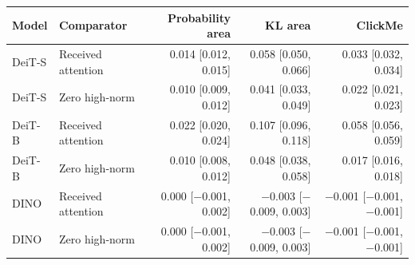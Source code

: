 \begin{tabular}{@{}llrrr@{}}
\toprule
Model & Comparator & Probability area & KL area & ClickMe \\
\midrule
DeiT-S & Received attention & 0.014 [0.012, 0.015] & 0.058 [0.050, 0.066] & 0.033 [0.032, 0.034] \\
DeiT-S & Zero high-norm & 0.010 [0.009, 0.012] & 0.041 [0.033, 0.049] & 0.022 [0.021, 0.023] \\
DeiT-B & Received attention & 0.022 [0.020, 0.024] & 0.107 [0.096, 0.118] & 0.058 [0.056, 0.059] \\
DeiT-B & Zero high-norm & 0.010 [0.008, 0.012] & 0.048 [0.038, 0.058] & 0.017 [0.016, 0.018] \\
DINO & Received attention & 0.000 [$-$0.001, 0.002] & $-$0.003 [$-$0.009, 0.003] & $-$0.001 [$-$0.001, $-$0.001] \\
DINO & Zero high-norm & 0.000 [$-$0.001, 0.002] & $-$0.003 [$-$0.009, 0.003] & $-$0.001 [$-$0.001, $-$0.001] \\
\bottomrule
\end{tabular}
